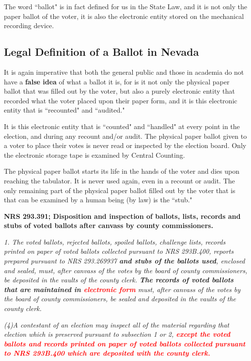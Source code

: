 The word ``ballot" is in fact defined for us in the State Law, and it is not only the paper ballot of the voter, it is also the electronic entity stored on the mechanical recording device.

\subsection{Legal Definition of a Ballot in Nevada}
It is again imperative that both the general public and those in academia do not have a \textbf{false idea} of what a ballot it is, for is it not only the physical paper ballot that was filled out by the voter, but also a purely electronic entity that recorded what the voter placed upon their paper form, and it is this electronic entity that is ``recounted" and ``audited." 

It is this electronic entity that is ``counted" and ``handled" at every point in the election, and during any recount and/or audit. The physical paper ballot given to a voter to place their votes is never read or inspected by the election board. Only the electronic storage tape is examined by Central Counting.

The physical paper ballot starts its life in the hands of the voter and dies upon reaching the tabulator. It is never used again, even in a recount or audit. The only remaining part of the physical paper ballot filled out by the voter that is that can be examined by a human being (by law) is the ``stub."

\textbf{NRS 293.391; Disposition and inspection of ballots, lists, records and \textbf{stubs} of voted ballots after canvass by county commissioners.}

\textit{1. The voted ballots, rejected ballots, spoiled ballots, challenge lists, records printed on paper of voted ballots collected pursuant to NRS 293B.400, reports prepared pursuant to NRS 293.269937 \textbf{and stubs of the ballots used}, enclosed and sealed, must, after canvass of the votes by the board of county commissioners, be deposited in the vaults of the county clerk. \textbf{The records of voted ballots that are maintained in \textcolor{red}{electronic form}} must, after canvass of the votes by the board of county commissioners, be sealed and deposited in the vaults of the county clerk.}

\textit{(4)A contestant of an election may inspect all of the material regarding that election which is preserved pursuant to subsection 1 or 2, \textbf{\textcolor{red}{except the voted ballots and records printed on paper of voted ballots collected pursuant to NRS 293B.400 which are deposited with the county clerk.}}}

